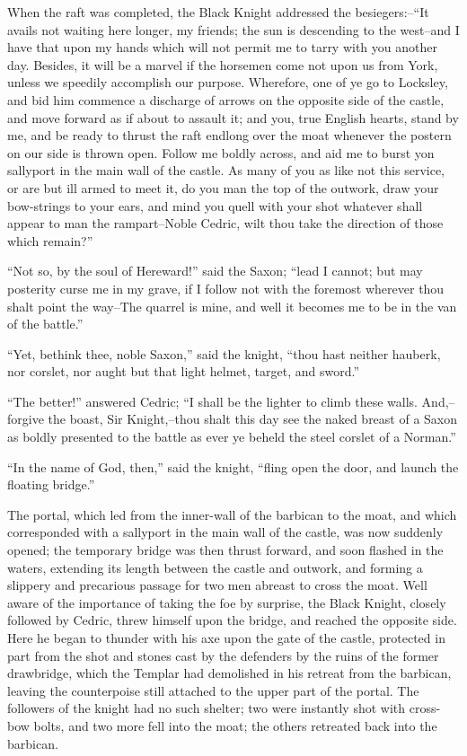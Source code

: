 When the raft was completed, the Black Knight addressed the
besiegers:--``It avails not waiting here longer, my friends; the sun is
descending to the west--and I have that upon my hands which will not
permit me to tarry with you another day. Besides, it will be a marvel if
the horsemen come not upon us from York, unless we speedily accomplish
our purpose. Wherefore, one of ye go to Locksley, and bid him commence a
discharge of arrows on the opposite side of the castle, and move forward
as if about to assault it; and you, true English hearts, stand by me,
and be ready to thrust the raft endlong over the moat whenever the
postern on our side is thrown open. Follow me boldly across, and aid me
to burst yon sallyport in the main wall of the castle. As many of you as
like not this service, or are but ill armed to meet it, do you man the
top of the outwork, draw your bow-strings to your ears, and mind you
quell with your shot whatever shall appear to man the rampart--Noble
Cedric, wilt thou take the direction of those which remain?''

``Not so, by the soul of Hereward!'' said the Saxon; ``lead I cannot;
but may posterity curse me in my grave, if I follow not with the
foremost wherever thou shalt point the way--The quarrel is mine, and
well it becomes me to be in the van of the battle.''

``Yet, bethink thee, noble Saxon,'' said the knight, ``thou hast neither
hauberk, nor corslet, nor aught but that light helmet, target, and
sword.''

``The better!'' answered Cedric; ``I shall be the lighter to climb these
walls. And,--forgive the boast, Sir Knight,--thou shalt this day see the
naked breast of a Saxon as boldly presented to the battle as ever ye
beheld the steel corslet of a Norman.''

``In the name of God, then,'' said the knight, ``fling open the door,
and launch the floating bridge.''

The portal, which led from the inner-wall of the barbican to the moat,
and which corresponded with a sallyport in the main wall of the castle,
was now suddenly opened; the temporary bridge was then thrust forward,
and soon flashed in the waters, extending its length between the castle
and outwork, and forming a slippery and precarious passage for two men
abreast to cross the moat. Well aware of the importance of taking the
foe by surprise, the Black Knight, closely followed by Cedric, threw
himself upon the bridge, and reached the opposite side. Here he began to
thunder with his axe upon the gate of the castle, protected in part from
the shot and stones cast by the defenders by the ruins of the former
drawbridge, which the Templar had demolished in his retreat from the
barbican, leaving the counterpoise still attached to the upper part of
the portal. The followers of the knight had no such shelter; two were
instantly shot with cross-bow bolts, and two more fell into the moat;
the others retreated back into the barbican.

